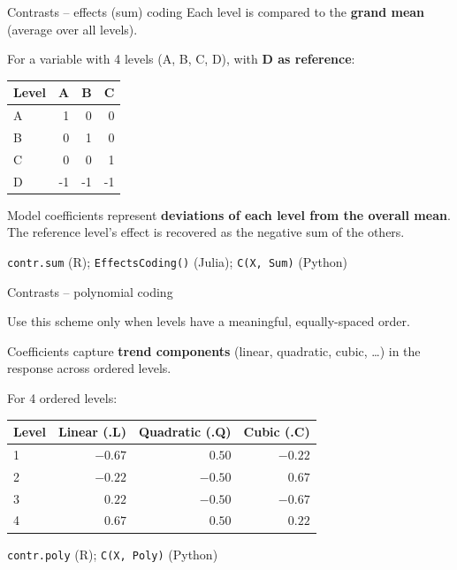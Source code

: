\documentclass[10pt,ignorenonframetext,aspectratio=169]{beamer}
\begin{document}
\begin{frame}{Contrasts -- effects (sum) coding}
Each level is compared to the \textbf{grand mean} (average over all levels).

\smallskip
For a variable with 4 levels (A, B, C, D), with \textbf{D as reference}:

\begin{table}[ht]
\centering
\begin{tabular}{lrrr}
  \hline
  Level & A & B & C \\
  \hline
  A &  1 &  0 &  0 \\
  B &  0 &  1 &  0 \\
  C &  0 &  0 &  1 \\
  D & -1 & -1 & -1 \\
  \hline
\end{tabular}
\end{table}

Model coefficients represent \textbf{deviations of each level from the overall mean}. 
The reference level's effect is recovered as the negative sum of the others.

\smallskip
\texttt{contr.sum} (R); \texttt{EffectsCoding()} (Julia); \texttt{C(X, Sum)} (Python)
\end{frame}




\begin{frame}{Contrasts -- polynomial coding}

Use this scheme only when levels have a meaningful, equally-spaced order.

Coefficients capture \textbf{trend components} (linear, quadratic, cubic, \ldots) 
in the response across ordered levels.

\smallskip
For 4 ordered levels:
\begin{table}[ht]
\centering
\begin{tabular}{lrrr}
  \hline
  Level & Linear (.L) & Quadratic (.Q) & Cubic (.C) \\
  \hline
  1 & $-0.67$ &  $0.50$ & $-0.22$ \\
  2 & $-0.22$ & $-0.50$ &  $0.67$ \\
  3 &  $0.22$ & $-0.50$ & $-0.67$ \\
  4 &  $0.67$ &  $0.50$ &  $0.22$ \\
  \hline
\end{tabular}
\end{table}

\texttt{contr.poly} (R); \texttt{C(X, Poly)} (Python)
\end{frame}
\end{document}
